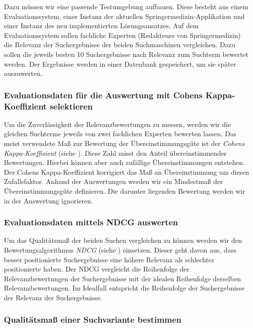 Dazu müssen wir eine passende Testumgebung aufbauen. Diese besteht aus einem Evaluationssystem, einer Instanz der aktuellen Springermedizin-Applikation und einer Instanz des neu implementierten Lösungsansatzes. Auf dem Evaluationssystem sollen fachliche Experten (Redakteure von Springermedizin) die Relevanz der Suchergebnisse  der beiden Suchmaschinen vergleichen. Dazu sollen die jeweils besten 10 Suchergebnisse nach Relevanz zum Suchterm bewertet werden. Der Ergebnisse werden in einer Datenbank gespeichert, um sie später auszuwerten. 

\subsubsection{Evaluationsdaten für die Auswertung mit Cohens Kappa-Koeffizient selektieren}
\label{sec:Einfuehrung:Methodik:Evaluation:EvaluationsdatenSelektieren}

Um die Zuverlässigkeit der Relevanzbewertungen zu messen, werden wir die gleichen Suchterme jeweils von zwei fachlichen Experten bewerten lassen. Das  meist verwendete  Maß  zur  Bewertung  der Übereinstimmungsgüte ist der \textit{Cohens Kappa-Koeffizient} (siehe \cite{Kappa}). Diese Zahl misst den  Anteil übereinstimmender Bewertungen. Hierbei können aber auch zufällige Übereinstimmungen entstehen. Der Cohens Kappa-Koeffizient korrigiert das Maß an Übereinstimmung um diesen Zufallsfaktor. Anhand der Auswertungen werden wir ein Mindestmaß der Übereinstimmungsgüte definieren. Die darunter liegenden Bewertung werden wir in der Auswertung ignorieren. 

\subsubsection{Evaluationsdaten mittels NDCG auswerten}
\label{sec:Einfuehrung:Methodik:Evaluation:EvaluationsdatenNDCG}

Um das Qualitätsmaß der beiden Suchen vergleichen zu können werden wir den Bewertungsalgorithmus \textit{NDCG} (siehe \cite{NDCG}) einsetzen. Dieser geht davon aus, dass besser positionierte Suchergebnisse eine höhere Relevanz als schlechter positionierte haben. Der NDCG vergleicht die Reihenfolge der Relevanzbewertungen der Suchergebnisse mit der idealen Reihenfolge derselben Relevanzbewertungen. Im Idealfall entspricht die Reihenfolge der Suchergebnisse der Relevanz der Suchergebnisse.

\subsubsection{Qualitätsmaß einer Suchvariante bestimmen}
\label{sec:Einfuehrung:Methodik:Evaluation:QualitaetMessen}


